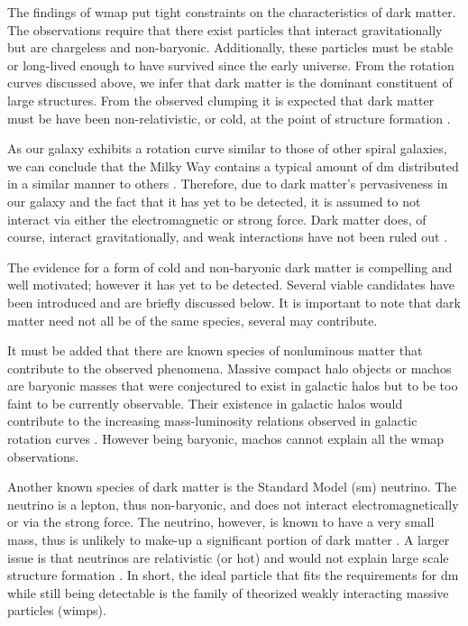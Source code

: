 The findings of \gls{wmap} put tight constraints on the characteristics of dark matter. The observations require that there exist particles that interact gravitationally but are chargeless and non-baryonic. Additionally, these particles must be stable or long-lived enough to have survived since the early universe. From the rotation curves discussed above, we infer that dark matter is the dominant constituent of large structures. From the observed clumping it is expected that dark matter must be have been non-relativistic, or cold, at the point of structure formation \cite{wmap9Year}. 

As our galaxy exhibits a rotation curve similar to those of other spiral galaxies, we can conclude that the Milky Way contains a typical amount of \gls{dm} distributed in a similar manner to others \cite{milkyWayRotations}. Therefore, due to dark matter's pervasiveness in our galaxy and the fact that it has yet to be detected, it is assumed to not interact via either the electromagnetic or strong force. Dark matter does, of course, interact gravitationally, and weak interactions have not been ruled out \cite{SMIntro}.


The evidence for a form of cold and non-baryonic dark matter is compelling and well motivated; however it has yet to be detected. Several viable candidates have been introduced and are briefly discussed below. It is important to note that dark matter need not all be of the same species, several may contribute. 

It must be added that there are known species of nonluminous matter that contribute to the observed phenomena. Massive compact halo objects or \gls{macho}s are baryonic masses that were conjectured to exist in galactic halos but to be too faint to be currently observable. Their existence in galactic halos would contribute to the increasing mass-luminosity relations observed in galactic rotation curves \cite{particlDarkMatterReview}. However being baryonic, \gls{macho}s cannot explain all the \gls{wmap} observations.

Another known species of dark matter is the Standard Model (\gls{sm}) neutrino. The neutrino is a lepton, thus non-baryonic, and does not interact electromagnetically or via the strong force. The neutrino, however, is known to have a very small mass, thus is unlikely to make-up a significant portion of dark matter \cite{particlDarkMatterReview}. A larger issue is that neutrinos are relativistic (or hot) and would not explain large scale structure formation \cite{particlDarkMatterReview}. In short, the ideal particle that fits the requirements for \gls{dm} while still being detectable is the family of theorized weakly interacting massive particles (\gls{wimp}s). 


